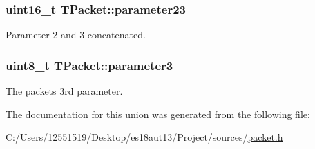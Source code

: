 \subsubsection[{parameter23}]{\setlength{\rightskip}{0pt plus 5cm}uint16\+\_\+t T\+Packet\+::parameter23}\label{union_t_packet_a92905f7e01f01bd1439dc4668b6808c1}
Parameter 2 and 3 concatenated. \hypertarget{union_t_packet_ab3ac2f9a6cfe5b6a7ae0987d21de472b}{}
\subsubsection[{parameter3}]{\setlength{\rightskip}{0pt plus 5cm}uint8\+\_\+t T\+Packet\+::parameter3}\label{union_t_packet_ab3ac2f9a6cfe5b6a7ae0987d21de472b}
The packet\textquotesingle{}s 3rd parameter. 

The documentation for this union was generated from the following file\+:\begin{DoxyCompactItemize}
\item 
C\+:/\+Users/12551519/\+Desktop/es18aut13/\+Project/sources/\hyperlink{packet_8h}{packet.\+h}\end{DoxyCompactItemize}
